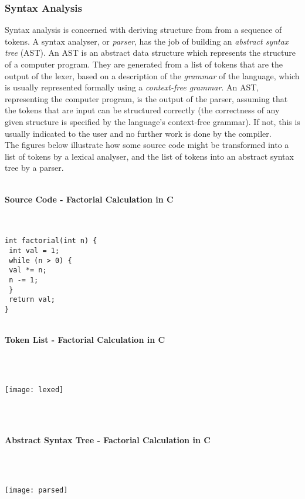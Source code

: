 \documentclass{article}
\begin{document}
\subsubsection{Syntax Analysis}
Syntax analysis is concerned with deriving structure from from a sequence of tokens. A syntax analyser, or \emph{parser}, has the job of building an \emph{abstract syntax tree} (AST). An AST is an abstract data structure which represents the structure of a computer program. They are generated from a list of tokens that are the output of the lexer, based on a description of the \emph{grammar} of the language, which is usually represented formally using a \emph{context-free grammar}. An AST, representing the computer program, is the output of the parser, assuming that the tokens that are input can be structured correctly (the correctness of any given structure is specified by the language's context-free grammar). If not, this is usually indicated to the user and no further work is done by the compiler.
\\\indent The figures below illustrate how some source code might be transformed into a list of tokens by a lexical analyser, and the list of tokens into an abstract syntax tree by a parser.
\\\\
\centerline{\textbf{Source Code - Factorial Calculation in C}}
\\\\
\indent \hspace{34mm} \texttt{int factorial(int n) \{    } \\
\indent \hspace{40mm} \texttt{    int val = 1;           } \\
\indent \hspace{40mm} \texttt{    while (n > 0) \{       } \\
\indent \hspace{48mm} \texttt{        val *= n;          } \\
\indent \hspace{48mm} \texttt{        n -= 1;            } \\
\indent \hspace{40mm} \texttt{    \}                     } \\
\indent \hspace{40mm} \texttt{    return val;            } \\
\indent \hspace{34mm} \texttt{\}                         } \\
\\
\centerline{\textbf{Token List - Factorial Calculation in C}}
\\\\
\centerline{\texttt{[image: lexed]}}
\\\\
\centerline{\textbf{Abstract Syntax Tree - Factorial Calculation in C}}
\\\\
\centerline{\texttt{[image: parsed]}}
\end{document}
